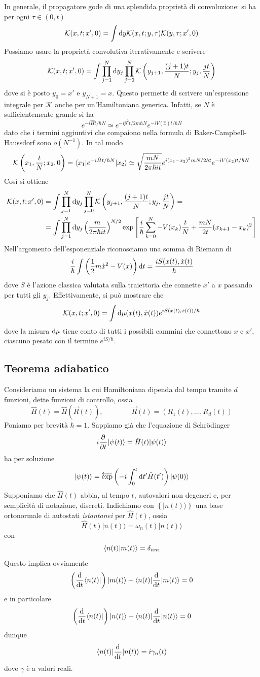 \documentclass[a4paper, 11pt]{article}
\newcommand{\ham}{\hat{H}}
\renewcommand{\ket}[1]{| #1\rangle}
\renewcommand{\bra}[1]{\langle #1|}
\begin{document}
In generale, il propagatore gode di una splendida proprietà di convoluzione: si ha per ogni $\tau\in(0,t)$
\[\mathcal{K}(x,t;x',0)=\int \mathrm{d} y\mathcal{K}(x,t;y,\tau)\mathcal{K}(y,\tau;x',0)\]
Possiamo usare la proprietà convolutiva iterativamente e scrivere
\[\mathcal{K}(x,t;x',0)=\int\prod_{j=1}^{N}\mathrm{d} y_j\prod_{j=0}^N\mathcal{K}\left(y_{j+1},\frac{(j+1)t}{N};y_j,\frac{jt}{N}\right)\]
dove si è posto ${y}_0={x}'$ e ${y}_{N+1}={x}$. Questo permette di scrivere un'espressione integrale per $\mathcal{K}$ anche per un'Hamiltoniana generica. Infatti, se $N$ è sufficientemente grande si ha
\[e^{-i\ham t/\hbar N}\simeq e^{-i\hat{p}^2t/2m\hbar N}e^{-iV(\hat{x})t/\hbar N}\]
dato che i termini aggiuntivi che compaiono nella formula di Baker-Campbell-Haussdorf sono $o(N^{-1})$. In tal modo
\[\mathcal{K}\left(x_1,\frac{t}{N};x_2,0\right)=\braketop{x_1}{e^{-i\ham t/\hbar N}}{x_2}\simeq\sqrt{\frac{mN}{2\pi\hbar i t}}e^{i(x_1-x_2)^2mN/2\hbar t}e^{-iV(x_2)t/\hbar N}\]Così si ottiene
\begin{align*}\mathcal{K}(x,t;x',0)&=\int\prod_{j=1}^{N}\mathrm{d} y_j\prod_{j=0}^N\mathcal{K}\left(y_{j+1},\frac{(j+1)t}{N};y_j,\frac{jt}{N}\right)=\\&=\int\prod_{j=1}^{N}\mathrm{d} y_j\left(\frac{m}{2\pi\hbar it}\right)^{N/2}\exp\left[\frac{i}{\hbar}\sum_{k=0}^{N}-V(x_k)\frac{t}{N}+\frac{mN}{2t}(x_{k+1}-x_k)^2\right]\end{align*}
Nell'argomento dell'esponenziale riconosciamo una somma di Riemann di 
\[\frac{i}{\hbar}\int\left(\frac{1}{2}m\dot{x}^2-V(x)\right)\mathrm{d} t=\frac{iS(x(t),\dot{x}(t)}{\hbar}\]
dove $S$ è l'azione classica valutata sulla traiettoria che connette $x'$ a $x$ passando per tutti gli $y_j$. Effettivamente, si può mostrare che
\[\mathcal{K}(x,t;x',0)=\int\mathrm{d} \mu(x(t),\dot{x}(t))e^{iS(x(t),\dot{x}(t))/\hbar}\]
dove la misura $\mathrm{d}\mu$ tiene conto di tutti i possibili cammini che connettono $x$ e $x'$, ciascuno pesato con il termine $e^{iS/\hbar}$.

\subsection{Teorema adiabatico}
Consideriamo un sistema la cui Hamiltoniana dipenda dal tempo tramite $d$ funzioni, dette funzioni di controllo, ossia
\[\ham(t)=\ham(\vec{R}(t)),\qquad\qquad\vec{R}(t)=(R_1(t),\dots, R_d(t))\]
Poniamo per brevità $\hbar=1$. Sappiamo già che l'equazione di Schr\"odinger
\[i\pder{}{t}\ket{\psi(t)}=\ham(t)\ket{\psi(t)}\]
ha per soluzione
\[\ket{\psi(t)}=\overleftarrow{\exp}\left(-i\int_{0}^{t}\d t'\ham (t')\right)\ket{\psi(0)}\]
Supponiamo che $\ham(t)$ abbia, al tempo $t$, autovalori non degeneri e, per semplicità di notazione, discreti. Indichiamo con $\left\{\ket{n(t)}\right\}$ una base ortonormale di autostati \emph{istantanei} per $\ham(t)$, ossia
\[\ham(t)\ket{n(t)}=\omega_n(t)\ket{n(t)}\]
con
\[\langle n(t)\vert m(t)\rangle=\delta_{nm}\]
Questo implica ovviamente
\begin{equation}\label{eq:der}\left(\der{}{t}\bra{n(t)}\right)\ket{m(t)}+\bra{n(t)}\der{}{t}\ket{m(t)}=0\end{equation}
e in particolare
\[\left(\der{}{t}\bra{n(t)}\right)\ket{n(t)}+\braketop{n(t)}{\der{}{t}}{n(t)}=0\]
dunque
\[\langle n(t)|\dfrac{\mathrm{d} ^{}}{\mathrm{d} {t}^{}}|n(t)\rangle=i\gamma_n(t)\]
dove $\gamma$ è a valori reali.
\end{document}
